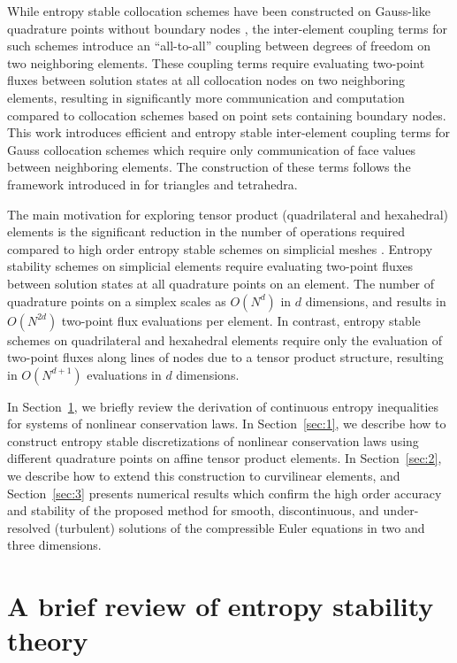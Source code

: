 \documentclass[review,onefignum,onetabnum,final]{siamart171218}
\begin{document}
While entropy stable collocation schemes have been constructed on Gauss-like quadrature points without boundary nodes \cite{crean2017high}, the inter-element coupling terms for such schemes introduce an ``all-to-all'' coupling between degrees of freedom on two neighboring elements.  These coupling terms require evaluating two-point fluxes between solution states at all collocation nodes on two neighboring elements, resulting in significantly more communication and computation compared to collocation schemes based on point sets containing boundary nodes.  This work introduces efficient and entropy stable inter-element coupling terms for Gauss collocation schemes which require only communication of face values between neighboring elements.  The construction of these terms follows the framework introduced in \cite{chan2017discretely, chan2018discretely} for triangles and tetrahedra.  

The main motivation for exploring tensor product (quadrilateral and hexahedral) elements is the significant reduction in the number of operations required compared to high order entropy stable schemes on simplicial meshes \cite{chan2017discretely, chan2018discretely}.  Entropy stability schemes on simplicial elements require evaluating two-point fluxes between solution states at all quadrature points on an element.  The number of quadrature points on a simplex scales as $O(N^d)$ in $d$ dimensions, and results in $O(N^{2d})$ two-point flux evaluations per element.  In contrast, entropy stable schemes on quadrilateral and hexahedral elements require only the evaluation of two-point fluxes along lines of nodes due to a tensor product structure, resulting in $O(N^{d+1})$ evaluations in $d$ dimensions.  

In Section~\ref{sec:0}, we briefly review the derivation of continuous entropy inequalities for systems of nonlinear conservation laws.  In Section~\ref{sec:1}, we describe how to construct entropy stable discretizations of nonlinear conservation laws using different quadrature points on affine tensor product elements.  In Section~\ref{sec:2}, we describe how to extend this construction to curvilinear elements, and Section~\ref{sec:3} presents numerical results which confirm the high order accuracy and stability of the proposed method for smooth, discontinuous, and under-resolved (turbulent) solutions of the compressible Euler equations in two and three dimensions.  

\section{A brief review of entropy stability theory}
\label{sec:0}
\end{document}
